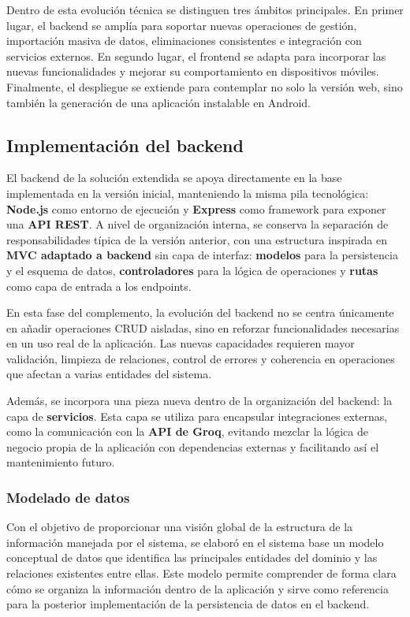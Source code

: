 Dentro de esta evolución técnica se distinguen tres ámbitos principales. En primer lugar, el backend se amplía para soportar nuevas operaciones de gestión, importación masiva de datos, eliminaciones consistentes e integración con servicios externos. En segundo lugar, el frontend se adapta para incorporar las nuevas funcionalidades y mejorar su comportamiento en dispositivos móviles. Finalmente, el despliegue se extiende para contemplar no solo la versión web, sino también la generación de una aplicación instalable en Android.

\subsection{Implementación del backend}
\label{sec:backend_impl}

El backend de la solución extendida se apoya directamente en la base implementada en la versión inicial, manteniendo la misma pila tecnológica: \textbf{Node.js} como entorno de ejecución y \textbf{Express} como framework para exponer una \textbf{API REST}. A nivel de organización interna, se conserva la separación de responsabilidades típica de la versión anterior, con una estructura inspirada en \textbf{MVC adaptado a backend} sin capa de interfaz: \textbf{modelos} para la persistencia y el esquema de datos, \textbf{controladores} para la lógica de operaciones y \textbf{rutas} como capa de entrada a los endpoints.

En esta fase del complemento, la evolución del backend no se centra únicamente en añadir operaciones CRUD aisladas, sino en reforzar funcionalidades necesarias en un uso real de la aplicación. Las nuevas capacidades requieren mayor validación, limpieza de relaciones, control de errores y coherencia en operaciones que afectan a varias entidades del sistema.

Además, se incorpora una pieza nueva dentro de la organización del backend: la capa de \textbf{servicios}. Esta capa se utiliza para encapsular integraciones externas, como la comunicación con la \textbf{API de Groq}, evitando mezclar la lógica de negocio propia de la aplicación con dependencias externas y facilitando así el mantenimiento futuro.

\subsubsection{Modelado de datos}

Con el objetivo de proporcionar una visión global de la estructura de la información manejada por el sistema, se elaboró en el sistema base un modelo conceptual de datos que identifica las principales entidades del dominio y las relaciones existentes entre ellas. Este modelo permite comprender de forma clara cómo se organiza la información dentro de la aplicación y sirve como referencia para la posterior implementación de la persistencia de datos en el backend.

